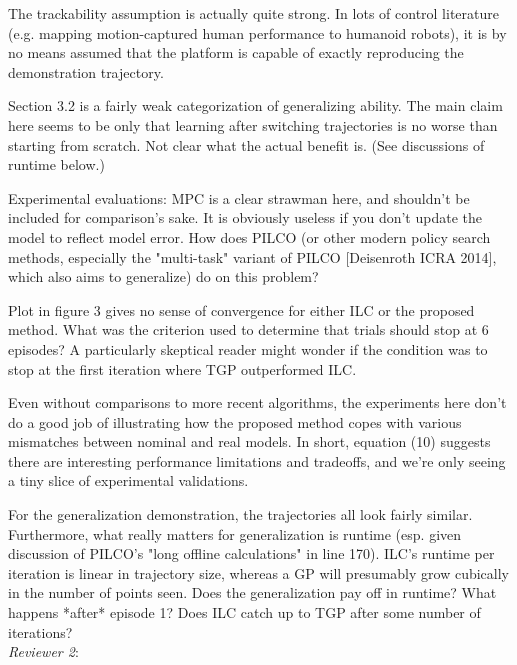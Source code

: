 \documentclass[10pt,a4paper]{article}
\begin{document}
The trackability assumption is actually quite strong. In lots of control literature (e.g. mapping motion-captured human performance to humanoid robots), it is by no means assumed that the platform is capable of exactly reproducing the demonstration trajectory.

Section 3.2 is a fairly weak categorization of generalizing ability. The main claim here seems to be only that learning after switching trajectories is no worse than starting from scratch. Not clear what the actual benefit is. (See discussions of runtime below.)

Experimental evaluations: MPC is a clear strawman here, and shouldn't be included for comparison's sake. It is obviously useless if you don't update the model to reflect model error. How does PILCO (or other modern policy search methods, especially the "multi-task" variant of PILCO [Deisenroth ICRA 2014], which also aims to generalize) do on this problem? 

Plot in figure 3 gives no sense of convergence for either ILC or the proposed method. What was the criterion used to determine that trials should stop at 6 episodes? A particularly skeptical reader might wonder if the condition was to stop at the first iteration where TGP outperformed ILC.

Even without comparisons to more recent algorithms, the experiments here don't do a good job of illustrating how the proposed method copes with various mismatches between nominal and real models. In short, equation (10) suggests there are interesting performance limitations and tradeoffs, and we're only seeing a tiny slice of experimental validations.

For the generalization demonstration, the trajectories all look fairly similar. Furthermore, what really matters for generalization is runtime (esp. given discussion of PILCO's "long offline calculations" in line 170). ILC's runtime per iteration is linear in trajectory size, whereas a GP will presumably grow cubically in the number of points seen. Does the generalization pay off in runtime? What happens *after* episode 1? Does ILC catch up to TGP after some number of iterations? \\

\emph{Reviewer 2}: \\
\end{document}
